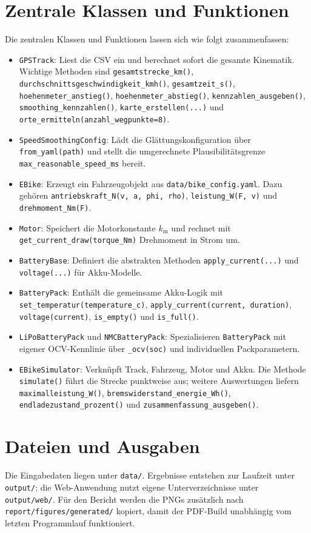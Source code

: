 \section{Zentrale Klassen und Funktionen}

Die zentralen Klassen und Funktionen lassen sich wie folgt zusammenfassen:

\begin{itemize}
\item \texttt{GPSTrack}: Liest die CSV ein und berechnet sofort die gesamte Kinematik. Wichtige Methoden sind \texttt{gesamtstrecke\_km()}, \texttt{durchschnittsgeschwindigkeit\_kmh()}, \texttt{gesamtzeit\_s()}, \texttt{hoehenmeter\_anstieg()}, \texttt{hoehenmeter\_abstieg()}, \texttt{kennzahlen\_ausgeben()}, \texttt{smoothing\_kennzahlen()}, \texttt{karte\_erstellen(...)} und \texttt{orte\_ermitteln(anzahl\_wegpunkte=8)}.
\item \texttt{SpeedSmoothingConfig}: Lädt die Glättungskonfiguration über \texttt{from\_yaml(path)} und stellt die umgerechnete Plausibilitätsgrenze \texttt{max\_reasonable\_speed\_ms} bereit.
\item \texttt{EBike}: Erzeugt ein Fahrzeugobjekt aus \texttt{data/bike\_config.yaml}. Dazu gehören \texttt{antriebskraft\_N(v, a, phi, rho)}, \texttt{leistung\_W(F, v)} und \texttt{drehmoment\_Nm(F)}.
\item \texttt{Motor}: Speichert die Motorkonstante \(k_{\mathrm{m}}\) und rechnet mit \texttt{get\_current\_draw(torque\_Nm)} Drehmoment in Strom um.
\item \texttt{BatteryBase}: Definiert die abstrakten Methoden \texttt{apply\_current(...)} und \texttt{voltage(...)} für Akku-Modelle.
\item \texttt{BatteryPack}: Enthält die gemeinsame Akku-Logik mit \texttt{set\_temperatur(temperature\_c)}, \texttt{apply\_current(current, duration)}, \texttt{voltage(current)}, \texttt{is\_empty()} und \texttt{is\_full()}.
\item \texttt{LiPoBatteryPack} und \texttt{NMCBatteryPack}: Spezialisieren \texttt{BatteryPack} mit eigener OCV-Kennlinie über \texttt{\_ocv(soc)} und individuellen Packparametern.
\item \texttt{EBikeSimulator}: Verknüpft Track, Fahrzeug, Motor und Akku. Die Methode \texttt{simulate()} führt die Strecke punktweise aus; weitere Auswertungen liefern \texttt{maximalleistung\_W()}, \texttt{bremswiderstand\_energie\_Wh()}, \texttt{endladezustand\_prozent()} und \texttt{zusammenfassung\_ausgeben()}.
\end{itemize}

\section{Dateien und Ausgaben}

Die Eingabedaten liegen unter \texttt{data/}. Ergebnisse entstehen zur Laufzeit unter \texttt{output/}; die Web-Anwendung nutzt eigene Unterverzeichnisse unter \texttt{output/web/}. Für den Bericht werden die PNGs zusätzlich nach \texttt{report/figures/generated/} kopiert, damit der PDF-Build unabhängig vom letzten Programmlauf funktioniert.
